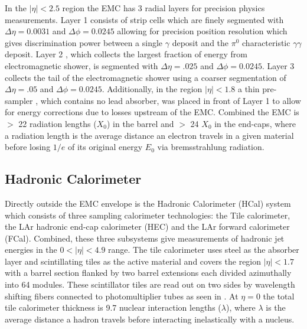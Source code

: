 In the $|\eta| < 2.5$ region the EMC has 3 radial layers for precision physics
measurements.  Layer 1 consists of strip cells which are finely segmented with
$\Delta\eta = 0.0031$ and $\Delta\phi = 0.0245$ allowing for precision position
resolution which gives discrimination power between a single $\gamma$ deposit
and the $\pi^0$ characteristic $\gamma\gamma$ deposit. Layer 2 , which collects
the largest fraction of energy from electromagnetic shower, is segmented with
$\Delta\eta = .025$ and $\Delta\phi = 0.0245$. Layer 3 collects the tail of the
electromagnetic shower using a coarser segmentation of $\Delta\eta = .05$ and
$\Delta\phi = 0.0245$.  Additionally, in the region $|\eta| < 1.8$ a thin
pre-sampler , which contains no lead absorber, was placed in front of Layer 1 to
allow for energy corrections due to losses upstream of the EMC.  Combined the
EMC is $>$ 22 radiation lengths ($X_0$) in the barrel and $>$ 24 $X_0$ in the
end-caps, where a radiation length is the average distance an electron travels
in a given material before losing $1/e$ of its original energy $E_0$ via
bremsstrahlung radiation.

\subsection{Hadronic Calorimeter}

Directly outside the EMC envelope is the Hadronic Calorimeter (HCal) system
\cite{PERF-2007-01} which consists of three sampling calorimeter technologies:
the Tile calorimeter, the LAr hadronic end-cap calorimeter (HEC) and the LAr
forward calorimeter (FCal).  Combined, these three subsystems give measurements
of hadronic jet energies in the $0 <|\eta| < 4.9$ range. The tile calorimeter
uses steel as the absorber layer and scintillating tiles as the active material
and covers the region $|\eta| < 1.7$ with a barrel section flanked by two barrel
extensions each divided azimuthally into 64 modules.  These scintillator tiles
are read out on two sides by wavelength shifting fibers connected to
photomultiplier tubes as seen in . At $\eta =
0$ the total tile calorimeter thickness is 9.7 nuclear interaction lengths
($\lambda$), where $\lambda$ is the average distance a hadron travels before
interacting inelastically with a nucleus.

